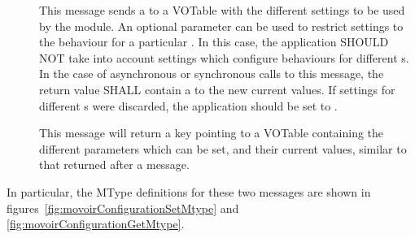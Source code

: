 		\begin{description}
			\item[] This message
			sends a  to a VOTable with the different
			settings to be used by the module. An optional
			 parameter can be used to restrict
			settings to the behaviour for a particular
			. In this case, the application SHOULD NOT
			take into account settings which configure behaviours
			for different s.
			In the case of asynchronous or synchronous calls to
			this message, the return value SHALL contain a
			 to the new current values.
			If settings for
			different s were discarded, the application
			\sampstatus{} should be set to \sampwarning{}.
			
			\item[] This message
			will return a  key pointing to a VOTable
			containing the different parameters which can be set,
			and their current values, similar to that returned
			after a  message.
		\end{description}
		
		In particular, the MType definitions for these two messages
		are shown in figures~\ref{fig:movoirConfigurationSetMtype}
		and \ref{fig:movoirConfigurationGetMtype}.
		

